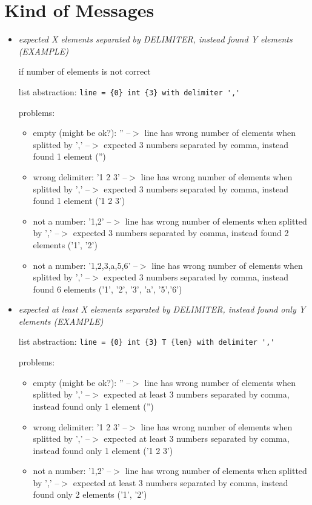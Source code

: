 \documentclass[11pt]{article}
\begin{document}
\section{Kind of Messages}

\begin{itemize}


\item \textit{expected X elements separated by DELIMITER, instead found Y elements (EXAMPLE)}

if number of elements is not correct

list abstraction: \verb|line = {0} int {3} with delimiter ','|

problems:
\begin{itemize}
\item empty (might be ok?): '' --$>$ line has wrong number of elements when splitted by ',' --$>$ expected 3 numbers separated by comma, instead found 1 element ('')
\item wrong delimiter: '1 2 3' --$>$ line has wrong number of elements when splitted by ',' --$>$ expected 3 numbers separated by comma, instead found 1 element ('1 2 3')
\item not a number: '1,2' --$>$ line has wrong number of elements when splitted by ',' --$>$ expected 3 numbers separated by comma, instead found 2 elements ('1', '2')
\item not a number: '1,2,3,a,5,6' --$>$ line has wrong number of elements when splitted by ',' --$>$ expected 3 numbers separated by comma, instead found 6 elements ('1', '2', '3', 'a', '5','6')
\end{itemize}

\item \textit{expected at least X elements separated by DELIMITER, instead found only Y elements (EXAMPLE)}

list abstraction: \verb|line = {0} int {3} T {len} with delimiter ','|

problems:
\begin{itemize}
\item empty (might be ok?): '' --$>$ line has wrong number of elements when splitted by ',' --$>$ expected at least 3 numbers separated by comma, instead found only 1 element ('')
\item wrong delimiter: '1 2 3' --$>$ line has wrong number of elements when splitted by ',' --$>$ expected at least 3 numbers separated by comma, instead found only 1 element ('1 2 3')
\item not a number: '1,2' --$>$ line has wrong number of elements when splitted by ',' --$>$ expected at least 3 numbers separated by comma, instead found only 2 elements ('1', '2')
\end{itemize}


\end{itemize}
\end{document}

